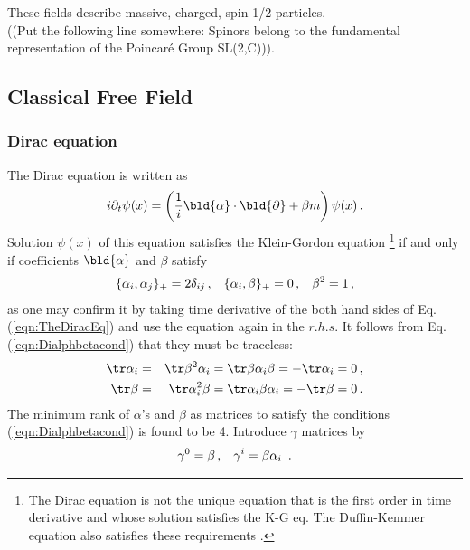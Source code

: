 \noindent
These fields describe massive, charged, spin 1/2 particles.\\
((Put the following line somewhere: Spinors belong to the fundamental representation of the Poincar\'e Group SL(2,C))).
\subsection{Classical Free Field}

\subsubsection{Dirac equation}

The Dirac equation is written as
\begin{eqnarray}
i \partial_t \psi (x) = 
\left(
\frac{1}{i} \bld{\alpha} \cdot \bld{\partial} + \beta m \right) \psi(x) \,.
\label{eqn:TheDiracEq}
\end{eqnarray}
Solution $\psi(x)$ of this equation satisfies the Klein-Gordon equation
\footnote{%
The Dirac equation is not the unique equation that
is the  first order in time derivative and whose solution satisfies the K-G eq.
The Duffin-Kemmer equation  also satisfies these requirements
\cite{ref:Itzykson-Zuber}.
 } %
if and only if coefficients $\bld{\alpha}$ and $\beta$ satisfy
\begin{eqnarray}
\{ \alpha_i, \alpha_j \}_+ = 2\delta_{ij}\,,
\hspace{3mm}
\{ \alpha_i, \beta \}_+ = 0\,,
\hspace{3mm}
\beta^2 = 1\,,
\label{eqn:Dialphbetacond}
\end{eqnarray}
as one may confirm it by taking time derivative of the both hand sides of Eq. (\ref{eqn:TheDiracEq})
and use the equation again in the $r.h.s.$
It follows from Eq. (\ref{eqn:Dialphbetacond}) that they must be traceless:
\begin{eqnarray}
\tr \alpha_i &=& \tr \beta^2 \alpha_i = \tr \beta \alpha_i \beta = - \tr \alpha_i = 0 \,,
\nonumber\\
\tr \beta &=& \tr \alpha_i^2 \beta  = \tr \alpha_i \beta \alpha_i  = - \tr \beta = 0 \,.
\nonumber
\end{eqnarray}
The minimum rank of $\alpha$'s and $\beta$ as matrices to satisfy the conditions 
(\ref{eqn:Dialphbetacond}) is found to be 4. 
Introduce $\gamma$ matrices by
\begin{eqnarray}
\gamma^0 = \beta\,,
\hspace{3mm}
\gamma^i = \beta \alpha_i\ \,.
\label{eqn:gammabyalphabeta}
\end{eqnarray}
